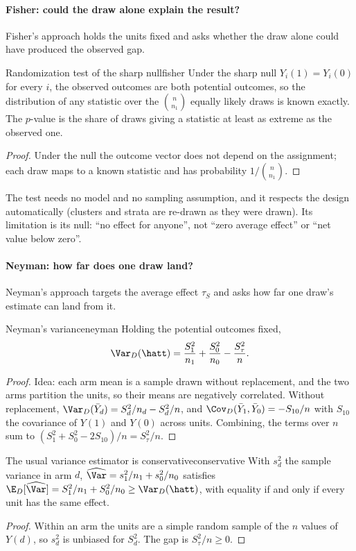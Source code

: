 \documentclass[11pt]{article}
\begin{document}
\paragraph{Fisher: could the draw alone explain the result?} Fisher's approach holds the units fixed and asks
whether the draw alone could have produced the observed gap.
\begin{prop}{Randomization test of the sharp null}{fisher}
Under the sharp null $Y_i(1) = Y_i(0)$ for every $i$, the observed outcomes are both potential outcomes,
so the distribution of any statistic over the $\binom{n}{n_1}$ equally likely draws is known exactly. The
$p$-value is the share of draws giving a statistic at least as extreme as the observed one.
\end{prop}
\begin{proof}
Under the null the outcome vector does not depend on the assignment; each draw maps to a known statistic
and has probability $1/\binom{n}{n_1}$.
\end{proof}
The test needs no model and no sampling assumption, and it respects the design automatically (clusters and
strata are re-drawn as they were drawn). Its limitation is its null: ``no effect for anyone'', not ``zero
average effect'' or ``net value below zero''.

\paragraph{Neyman: how far does one draw land?} Neyman's approach targets the average effect $\tau_S$ and asks
how far one draw's estimate can land from it.
\begin{prop}{Neyman's variance}{neyman}
Holding the potential outcomes fixed,
\[
  \Var_D(\hatt) = \frac{S_1^2}{n_1} + \frac{S_0^2}{n_0} - \frac{S_\tau^2}{n}.
\]
\end{prop}
\begin{proof}
Idea: each arm mean is a sample drawn without replacement, and the two arms partition the units, so their
means are negatively correlated. Without replacement, $\Var_D(\bar Y_d) = S_d^2/n_d - S_d^2/n$, and
$\Cov_D(\bar Y_1, \bar Y_0) = -S_{10}/n$ with $S_{10}$ the covariance of $Y(1)$ and $Y(0)$ across units.
Combining, the terms over $n$ sum to $(S_1^2 + S_0^2 - 2S_{10})/n = S_\tau^2/n$.
\end{proof}

\begin{prop}{The usual variance estimator is conservative}{conservative}
With $s_d^2$ the sample variance in arm $d$, $\widehat\Var = s_1^2/n_1 + s_0^2/n_0$ satisfies
$\E_D[\widehat\Var] = S_1^2/n_1 + S_0^2/n_0 \ge \Var_D(\hatt)$, with equality if and only if every unit has
the same effect.
\end{prop}
\begin{proof}
Within an arm the units are a simple random sample of the $n$ values of $Y(d)$, so $s_d^2$ is unbiased for
$S_d^2$. The gap is $S_\tau^2/n \ge 0$.
\end{proof}
\end{document}
